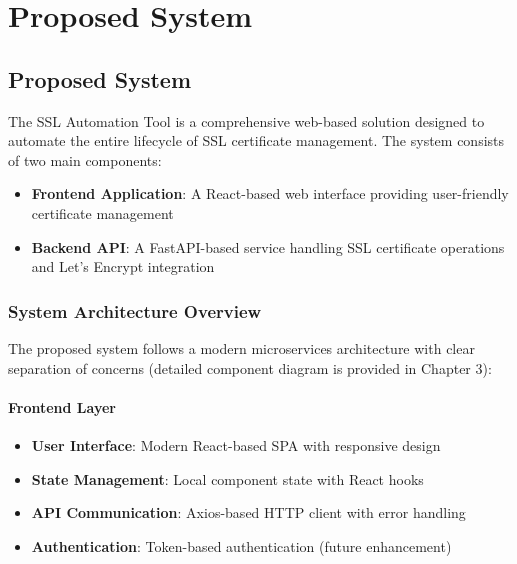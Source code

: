 
\chapter{Proposed System}\doublespacing %

\label{Chapter2} %


\section{Proposed System}

The SSL Automation Tool is a comprehensive web-based solution designed to automate the entire lifecycle of SSL certificate management. The system consists of two main components:

\begin{itemize}
    \item \textbf{Frontend Application}: A React-based web interface providing user-friendly certificate management
    \item \textbf{Backend API}: A FastAPI-based service handling SSL certificate operations and Let's Encrypt integration
\end{itemize}

\subsection{System Architecture Overview}

The proposed system follows a modern microservices architecture with clear separation of concerns (detailed component diagram is provided in Chapter 3):

\subsubsection{Frontend Layer}
\begin{itemize}
    \item \textbf{User Interface}: Modern React-based SPA with responsive design
    \item \textbf{State Management}: Local component state with React hooks
    \item \textbf{API Communication}: Axios-based HTTP client with error handling
    \item \textbf{Authentication}: Token-based authentication (future enhancement)
\end{itemize}


